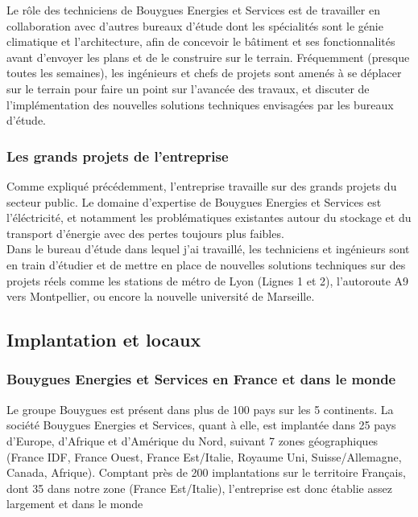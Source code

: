 \documentclass[a4paper]{article}
\begin{document}
    Le rôle des techniciens de Bouygues Energies et Services est de travailler en collaboration avec d’autres bureaux d’étude dont les spécialités sont le génie climatique et l’architecture, afin de concevoir le bâtiment et ses fonctionnalités avant d’envoyer les plans et de le construire sur le terrain. Fréquemment (presque toutes les semaines), les ingénieurs et chefs de projets sont amenés à se déplacer sur le terrain pour faire un point sur l’avancée des travaux, et discuter de l'implémentation des nouvelles solutions techniques envisagées par les bureaux d'étude. \\
 
    \subsubsection{Les grands projets de l'entreprise}

    Comme expliqué précédemment, l'entreprise travaille sur des grands projets du secteur public. Le domaine d'expertise de Bouygues Energies et Services est l'éléctricité, et notamment les problématiques existantes autour du stockage et du transport d'énergie avec des pertes toujours plus faibles. \\

    Dans le bureau d'étude dans lequel j'ai travaillé, les techniciens et ingénieurs sont en train d'étudier et de mettre en place de nouvelles solutions techniques sur des projets réels comme les stations de métro de Lyon (Lignes 1 et 2), l’autoroute A9 vers Montpellier, ou encore la nouvelle université de Marseille. \\

    \subsection{Implantation et locaux}
    \subsubsection{Bouygues Energies et Services en France et dans le monde}

    Le groupe Bouygues est présent dans plus de 100 pays sur les 5 continents. La société Bouygues Energies et Services, quant à elle, est implantée dans 25 pays d’Europe, d’Afrique et d’Amérique du Nord, suivant 7 zones géographiques (France IDF, France Ouest, France Est/Italie, Royaume Uni, Suisse/Allemagne, Canada, Afrique). Comptant près de 200 implantations sur le territoire Français, dont 35 dans notre zone (France Est/Italie), l’entreprise est donc 
    établie assez largement et dans le monde
\end{document}
